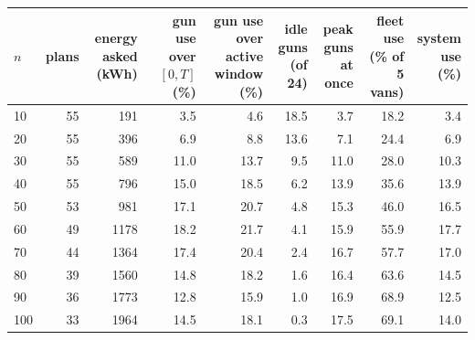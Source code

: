 \begin{tabular}{lrrrrrrrr}\toprule
$n$ & plans & \shortstack{energy\\asked (kWh)} & \shortstack{gun use\\over $[0,T]$ (\%)} & \shortstack{gun use over\\active window (\%)} & \shortstack{idle guns\\(of 24)} & \shortstack{peak guns\\at once} & \shortstack{fleet use\\(\% of 5 vans)} & \shortstack{system\\use (\%)} \\ \midrule
10 & 55 & 191 & 3.5 & 4.6 & 18.5 & 3.7 & 18.2 & 3.4 \\
20 & 55 & 396 & 6.9 & 8.8 & 13.6 & 7.1 & 24.4 & 6.9 \\
30 & 55 & 589 & 11.0 & 13.7 & 9.5 & 11.0 & 28.0 & 10.3 \\
40 & 55 & 796 & 15.0 & 18.5 & 6.2 & 13.9 & 35.6 & 13.9 \\
50 & 53 & 981 & 17.1 & 20.7 & 4.8 & 15.3 & 46.0 & 16.5 \\
60 & 49 & 1178 & 18.2 & 21.7 & 4.1 & 15.9 & 55.9 & 17.7 \\
70 & 44 & 1364 & 17.4 & 20.4 & 2.4 & 16.7 & 57.7 & 17.0 \\
80 & 39 & 1560 & 14.8 & 18.2 & 1.6 & 16.4 & 63.6 & 14.5 \\
90 & 36 & 1773 & 12.8 & 15.9 & 1.0 & 16.9 & 68.9 & 12.5 \\
100 & 33 & 1964 & 14.5 & 18.1 & 0.3 & 17.5 & 69.1 & 14.0 \\
\bottomrule\end{tabular}
